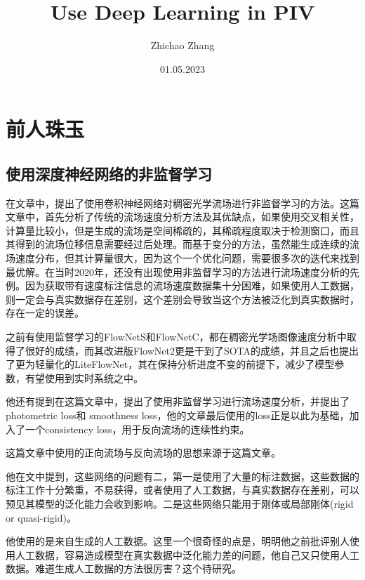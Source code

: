 \documentclass[UTF8]{ctexart}
\title{Use Deep Learning in PIV}  %
\author{Zhichao Zhang}  %
\date{01.05.2023}  %
\begin{document}
\maketitle
\tableofcontents

\section{前人珠玉}

\subsection{使用深度神经网络的非监督学习}

在文章\cite{zhang_unsupervised_2020}中，提出了使用卷积神经网络对稠密光学流场进行非监督学习的方法。这篇文章中，首先分析了传统的流场速度分析方法及其优缺点，如果使用交叉相关性，计算量比较小，但是生成的流场是空间稀疏的，其稀疏程度取决于检测窗口，而且其得到的流场位移信息需要经过后处理。而基于变分的方法，虽然能生成连续的流场速度分布，但其计算量很大，因为这个一个优化问题，需要很多次的迭代来找到最优解。在当时2020年，还没有出现使用非监督学习的方法进行流场速度分析的先例。因为获取带有速度标注信息的流场速度数据集十分困难，如果使用人工数据，则一定会与真实数据存在差别，这个差别会导致当这个方法被泛化到真实数据时，存在一定的误差。

之前有使用监督学习的FlowNetS和FlowNetC\cite{fischer_flownet_2015}，都在稠密光学场图像速度分析中取得了很好的成绩，而其改进版FlowNet2\cite{meister_unflow_2017}更是干到了SOTA的成绩，并且之后也提出了更为轻量化的LiteFlowNet，其在保持分析进度不变的前提下，减少了模型参数，有望使用到实时系统之中。

他还有提到在这篇文章\cite{yu_back_2016}中，提出了使用非监督学习进行流场速度分析，并提出了photometric loss和 smoothness loss，他的文章最后使用的loss正是以此为基础，加入了一个consistency loss，用于反向流场的连续性约束。

这篇文章中使用的正向流场与反向流场的思想来源于\cite{meister_unflow_2017}这篇文章。

他在文中提到，这些网络的问题有二，第一是使用了大量的标注数据，这些数据的标注工作十分繁重，不易获得，或者使用了人工数据，与真实数据存在差别，可以预见其模型的泛化能力会收到影响。二是这些网络只能用于刚体或局部刚体(rigid or quasi-rigid)。

他使用的是来自\cite{cai_flow_2021}生成的人工数据。这里一个很奇怪的点是，明明他之前批评别人使用人工数据，容易造成模型在真实数据中泛化能力差的问题，他自己又只使用人工数据。难道\cite{cai_flow_2021}生成人工数据的方法很厉害？这个待研究。
\end{document}
